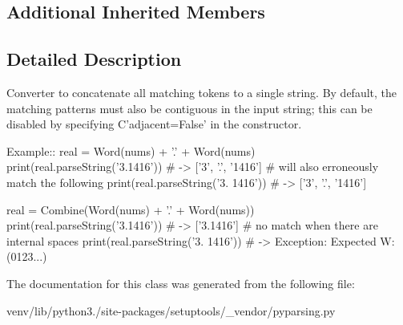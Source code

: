 \subsection*{Additional Inherited Members}


\subsection{Detailed Description}
\begin{DoxyVerb}Converter to concatenate all matching tokens to a single string.
By default, the matching patterns must also be contiguous in the input string;
this can be disabled by specifying C{'adjacent=False'} in the constructor.

Example::
    real = Word(nums) + '.' + Word(nums)
    print(real.parseString('3.1416')) # -> ['3', '.', '1416']
    # will also erroneously match the following
    print(real.parseString('3. 1416')) # -> ['3', '.', '1416']

    real = Combine(Word(nums) + '.' + Word(nums))
    print(real.parseString('3.1416')) # -> ['3.1416']
    # no match when there are internal spaces
    print(real.parseString('3. 1416')) # -> Exception: Expected W:(0123...)
\end{DoxyVerb}
 

The documentation for this class was generated from the following file\+:\begin{DoxyCompactItemize}
\item 
venv/lib/python3./site-\/packages/setuptools/\+\_\+vendor/pyparsing.\+py\end{DoxyCompactItemize}
